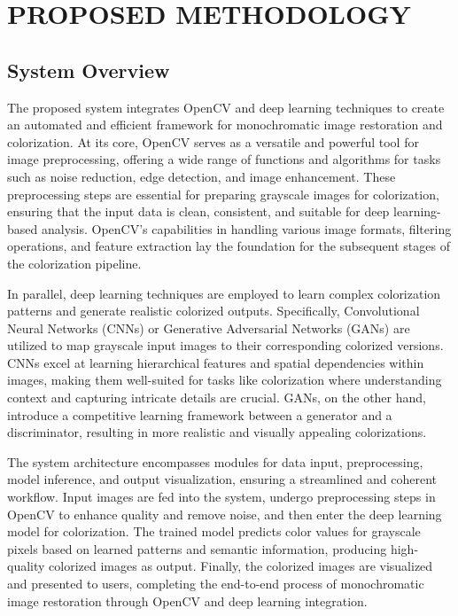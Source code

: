 \chapter{PROPOSED METHODOLOGY}

\section{System Overview}
The proposed system integrates OpenCV and deep learning techniques to create an automated and efficient framework for monochromatic image restoration and colorization. At its core, OpenCV serves as a versatile and powerful tool for image preprocessing, offering a wide range of functions and algorithms for tasks such as noise reduction, edge detection, and image enhancement. These preprocessing steps are essential for preparing grayscale images for colorization, ensuring that the input data is clean, consistent, and suitable for deep learning-based analysis. OpenCV's capabilities in handling various image formats, filtering operations, and feature extraction lay the foundation for the subsequent stages of the colorization pipeline.

In parallel, deep learning techniques are employed to learn complex colorization patterns and generate realistic colorized outputs. Specifically, Convolutional Neural Networks (CNNs) or Generative Adversarial Networks (GANs) are utilized to map grayscale input images to their corresponding colorized versions. CNNs excel at learning hierarchical features and spatial dependencies within images, making them well-suited for tasks like colorization where understanding context and capturing intricate details are crucial. GANs, on the other hand, introduce a competitive learning framework between a generator and a discriminator, resulting in more realistic and visually appealing colorizations.

The system architecture encompasses modules for data input, preprocessing, model inference, and output visualization, ensuring a streamlined and coherent workflow. Input images are fed into the system, undergo preprocessing steps in OpenCV to enhance quality and remove noise, and then enter the deep learning model for colorization. The trained model predicts color values for grayscale pixels based on learned patterns and semantic information, producing high-quality colorized images as output. Finally, the colorized images are visualized and presented to users, completing the end-to-end process of monochromatic image restoration through OpenCV and deep learning integration.


